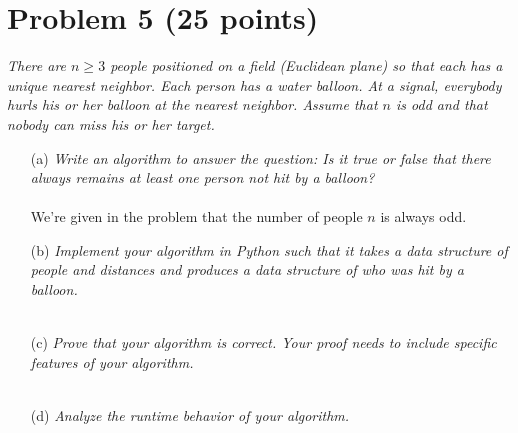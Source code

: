 \documentclass[12pt]{article}
\begin{document}
{\section*{{\selectfont Problem 5 (25 points)}}\vspace{-10mm}
\textsl{There are $n \geq 3$ people positioned on a field (Euclidean plane) so that each has a unique nearest neighbor. Each person has a water balloon. At a signal, everybody hurls his or her balloon at the nearest neighbor. Assume that $n$ is odd and that nobody can miss his or her target.}
\begin{enumerate}
\item[(a)]\textsl{Write an algorithm to answer the question: Is it true or false that there always remains at least one person not hit by a balloon?}\\ \\
We're given in the problem that the number of people $n$ is always odd. 
\item[(b)]\textsl{Implement your algorithm in Python such that it takes a data structure of people and distances and produces a data structure of who was hit by a balloon.}\\ \\
\item[(c)]\textsl{Prove that your algorithm is correct. Your proof needs to include specific features of your algorithm.}\\ \\
\item[(d)]\textsl{Analyze the runtime behavior of your algorithm.}\\ \\
\end{enumerate}
}
\end{document}
